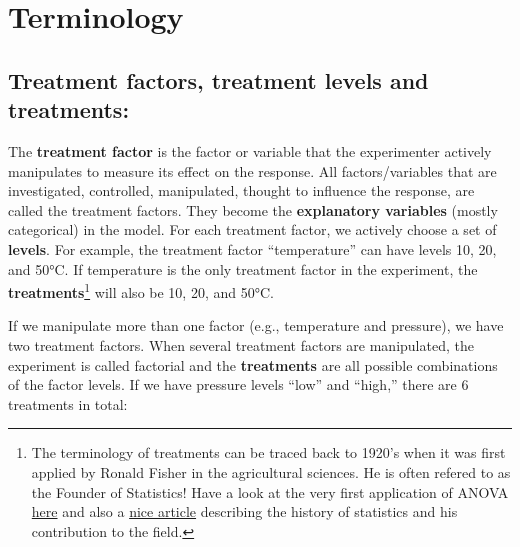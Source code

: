 \documentclass[
  letterpaper,
]{book}
\begin{document}
\chapter{Terminology}\label{terminology}

\section*{\texorpdfstring{\textbf{Treatment factors, treatment levels
and
treatments:}}{Treatment factors, treatment levels and treatments:}}\label{treatment-factors-treatment-levels-and-treatments}


The \textbf{treatment factor} is the factor or variable that the
experimenter actively manipulates to measure its effect on the response.
All factors/variables that are investigated, controlled, manipulated,
thought to influence the response, are called the treatment factors.
They become the \textbf{explanatory variables} (mostly categorical) in
the model. For each treatment factor, we actively choose a set of
\textbf{levels}. For example, the treatment factor ``temperature'' can
have levels 10, 20, and 50°C. If temperature is the only treatment
factor in the experiment, the \textbf{treatments}\footnote{The
  terminology of treatments can be traced back to 1920's when it was
  first applied by Ronald Fisher in the agricultural sciences. He is
  often refered to as the Founder of Statistics! Have a look at the very
  first application of ANOVA
  \href{https://www.cambridge.org/core/journals/journal-of-agricultural-science/article/abs/studies-in-crop-variation-i-an-examination-of-the-yield-of-dressed-grain-from-broadbalk/882CB236D1EC608B1A6C74CA96F82CC3}{here}
  and also a \href{https://www.jstor.org/stable/2245989}{nice article}
  describing the history of statistics and his contribution to the
  field.} will also be 10, 20, and 50°C.

If we manipulate more than one factor (e.g., temperature and pressure),
we have two treatment factors. When several treatment factors are
manipulated, the experiment is called factorial and the
\textbf{treatments} are all possible combinations of the factor levels.
If we have pressure levels ``low'' and ``high,'' there are 6 treatments
in total:
\end{document}
